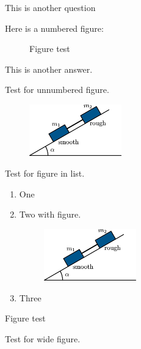 \documentclass[solutionsatend]{ouunit}
\begin{document}
\lipsum[133]

\begin{exercise}\label{exe-fig-test}
This is another question
\begin{solution}
Here is a numbered figure:
\begin{figure}
\caption{Figure test \label{fig-placement-test}}
\end{figure}
This is another answer.
\end{solution}
\end{exercise}

Test for unnumbered figure.

\begin{figure}
\includegraphics[width=4cm]{test}
\end{figure}

Test for figure in list.
\begin{enumerate}
\item
One
\item
Two with figure.
\begin{figure}
\includegraphics[width=4cm]{test}
\end{figure}
\item
Three
\end{enumerate}

\lipsum[1]
\begin{marginfigure}
\caption{Figure test \label{fig-ex-test}}
\end{marginfigure}
Test for wide figure.
\begin{widefigure*}
\end{widefigure*}
\end{document}
